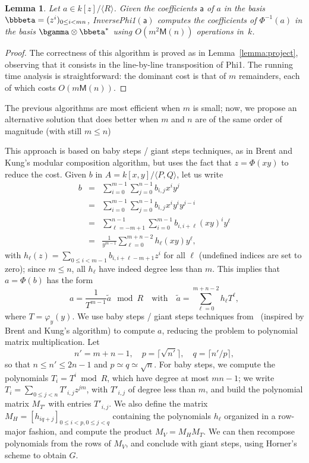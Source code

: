 \documentclass{sig-alternate}
\def\M {\ensuremath{\mathsf{M}}}
\def\va {\ensuremath{\mathsf{a}}}
\newcounter{algo}
\newcommand{\ang}[1]{\langle#1\rangle}
\newtheorem{Lemma}{Lemma}
\begin{document}
\begin{Lemma}
   Let $a\in k[z]/\ang{R}$. Given the coefficients $\va$ of $a$ in the
  basis $\bbbeta=(z^i)_{0 \le i < mn}$, {\sf InversePhi1}$(\va)$
  computes the coefficients of $\Phi^{-1}(a)$ in the basis $\bgamma
  \otimes \bbeta^\ast$ using $O(m^2\M(n))$ operations in~$k$.
\end{Lemma}
\begin{proof}
  The correctness of this algorithm is proved as in
  Lemma~\ref{lemma:project}, observing that it consists in the
  line-by-line transposition of {\sf Phi1}. The running time analysis is
  straightforward: the dominant cost is that of $m$ remainders, each
  of which costs $O(m\M(n))$.
\end{proof}

  The previous
algorithms are most efficient when $m$ is small; now, we propose an
alternative solution that does better when $m$ and $n$ are of the same
order of magnitude (with still $m \le n$)

This approach is based on baby steps / giant steps techniques, as in
Brent and Kung's modular composition algorithm, but uses the fact that
$z=\Phi(xy)$ to reduce the cost. Given $b$ in $A=k[x,y]/\ang{P,Q}$,
let us write
\begin{eqnarray*}
b&=&\sum_{i=0}^{m-1}\sum_{j=0}^{n-1} b_{i,j}x^i y^j\\
&=&\sum_{i=0}^{m-1}\sum_{j=0}^{n-1} b_{i,j}x^i y^i y^{j-i}\\
&=&\sum_{\ell=-m+1}^{n-1}\sum_{i=0}^{m-1} b_{i,i+\ell}(xy)^i y^\ell\\
&=&\frac{1}{y^{m-1}} \sum_{\ell=0}^{m+n-2} h_\ell(xy) y^\ell,
\end{eqnarray*}
with $h_\ell(z)=\sum_{0 \le i < m-1} b_{i,i+\ell-m+1} z^i$ for all
$\ell$ (undefined indices are set to zero); since $m \le n$, all
$h_\ell$ have indeed degree less than $m$. This implies that
$a=\Phi(b)$ has the form
$$a = \frac{1}{T^{m-1}}\widetilde{a} \mod R\quad\text{with}\quad
\widetilde{a}=\sum_{\ell=0}^{m+n-2} h_\ell T^\ell,$$ where $T=\varphi_y(y)$.
We use baby steps / giant steps techniques from~\cite{LeMeSc13}
(inspired by Brent and Kung's algorithm) to compute $a$, reducing the
problem to polynomial matrix multiplication. Let
$$n'=m+n-1,\quad p=\lceil \sqrt {n'} \rceil,\quad q=\lceil
n'/p\rceil,$$ so that $n \le n' \le 2n-1$ and $p\simeq q \simeq
\sqrt{n}$.  For baby steps, we compute the polynomials $T_i=T^i \bmod
R$, which have degree at most $mn-1$; we write $T_i = \sum_{0 \le j <
  n} T'_{i,j} z^{jm}$, with $T'_{i,j}$ of degree less than $m$, and
build the polynomial matrix $M_{T'}$ with entries $T'_{i,j}$.  We also
define the matrix $M_H=[h_{iq+j}]_{0 \le i <p, 0 \le j < q}$
containing the polynomials $h_\ell$ organized in a row-major fashion, and
compute the product $M_V=M_H M_T$. We can then recompose polynomials
from the rows of $M_V$, and conclude with giant steps, using Horner's
scheme to obtain $G$.
\end{document}
